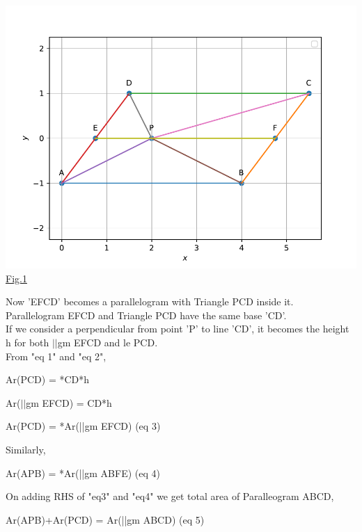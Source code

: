 \documentclass[10pt,a4paper]{report}
\begin{document}
\begin{multicols}{2}
\vspace{2mm} \centering \includegraphics[scale=0.4]{fig1.pdf} \\ \underline{Fig.1} \\
\raggedright Now 'EFCD' becomes a parallelogram with Triangle PCD inside it. 
\\ Parallelogram EFCD and Triangle PCD have the same base 'CD'.
\\If we consider a perpendicular from point 'P' to line 'CD', it becomes the height h for both $||$gm EFCD and \Delta le PCD. \\ From "eq 1" and "eq 2",\\
\raggedright \hspace{2cm} Ar(\Delta PCD) = *CD*h \\ \raggedright \hspace{2cm} Ar($||$gm EFCD) = CD*h \\ \raggedright \vspace{1mm} \hspace{1cm} \Rightarrow Ar(\Delta PCD) = *Ar(||gm EFCD) \hspace{1cm} (eq 3) \\ \raggedright Similarly, \\ \raggedright \vspace{1mm} \hspace{1cm} \Rightarrow Ar(\Delta APB) = *Ar(||gm ABFE) \hspace{1cm} (eq 4) \\ \raggedright On adding RHS of "eq3" and "eq4" we get total area of Paralleogram ABCD, \\ \vspace{3mm} \raggedright  \therefore Ar(\Delta APB)+Ar(\Delta PCD) = Ar(||gm ABCD) \hspace{5mm} (eq 5) \vspace{4mm}

\end{multicols}
\end{document}
